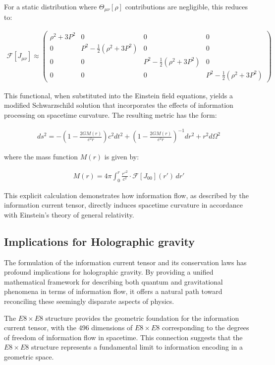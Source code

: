 \documentclass[11pt,english,twoside]{article}
\begin{document}
For a static distribution where $\Theta_{\mu\nu}[\rho]$ contributions are negligible, this reduces to:

\begin{align}
\mathcal{F}[J_{\mu\nu}] \approx \begin{pmatrix}
\rho^2 + 3P^2 & 0 & 0 & 0 \\
0 & P^2 - \frac{1}{2}(\rho^2+3P^2) & 0 & 0 \\
0 & 0 & P^2 - \frac{1}{2}(\rho^2+3P^2) & 0 \\
0 & 0 & 0 & P^2 - \frac{1}{2}(\rho^2+3P^2)
\end{pmatrix}
\end{align}

This functional, when substituted into the Einstein field equations, yields a modified Schwarzschild solution that incorporates the effects of information processing on spacetime curvature. The resulting metric has the form:

\begin{align}
ds^2 = -\left(1-\frac{2GM(r)}{c^2r}\right)c^2dt^2 + \left(1-\frac{2GM(r)}{c^2r}\right)^{-1}dr^2 + r^2d\Omega^2
\end{align}

where the mass function $M(r)$ is given by:

\begin{align}
M(r) = 4\pi \int_0^r \frac{r'^2}{c^2} \cdot \mathcal{F}[J_{00}](r') \, dr'
\end{align}

This explicit calculation demonstrates how information flow, as described by the information current tensor, directly induces spacetime curvature in accordance with Einstein's theory of general relativity.

\subsection{Implications for Holographic gravity}

The formulation of the information current tensor and its conservation laws has profound implications for holographic gravity. By providing a unified mathematical framework for describing both quantum and gravitational phenomena in terms of information flow, it offers a natural path toward reconciling these seemingly disparate aspects of physics.

The $E8\times E8$ structure provides the geometric foundation for the information current tensor, with the 496 dimensions of $E8\times E8$ corresponding to the degrees of freedom of information flow in spacetime. This connection suggests that the $E8\times E8$ structure represents a fundamental limit to information encoding in a geometric space.
\end{document}
